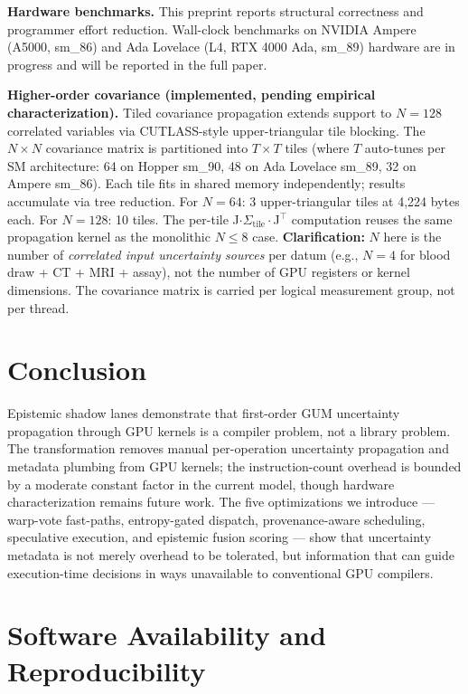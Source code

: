\documentclass[11pt]{article}
\begin{document}
{{{{\textbf{Hardware benchmarks.} This preprint reports structural correctness and programmer effort reduction. Wall-clock benchmarks on NVIDIA Ampere (A5000, sm_86) and Ada Lovelace (L4, RTX 4000 Ada, sm_89) hardware are in progress and will be reported in the full paper.

\textbf{Higher-order covariance (implemented, pending empirical characterization).} Tiled covariance propagation extends support to $N = 128$ correlated variables via CUTLASS-style upper-triangular tile blocking. The $N \times N$ covariance matrix is partitioned into $T \times T$ tiles (where $T$ auto-tunes per SM architecture: 64 on Hopper sm\_90, 48 on Ada Lovelace sm\_89, 32 on Ampere sm\_86). Each tile fits in shared memory independently; results accumulate via tree reduction. For $N = 64$: 3 upper-triangular tiles at 4,224 bytes each. For $N = 128$: 10 tiles. The per-tile J$\cdot\Sigma_{\text{tile}}\cdot$J$^\top$ computation reuses the same propagation kernel as the monolithic $N \leq 8$ case. \textbf{Clarification:} $N$ here is the number of \emph{correlated input uncertainty sources} per datum (e.g., $N = 4$ for blood draw + CT + MRI + assay), not the number of GPU registers or kernel dimensions. The covariance matrix is carried per logical measurement group, not per thread.


\section{Conclusion}

Epistemic shadow lanes demonstrate that first-order GUM uncertainty propagation through GPU kernels is a compiler problem, not a library problem. The transformation removes manual per-operation uncertainty propagation and metadata plumbing from GPU kernels; the instruction-count overhead is bounded by a moderate constant factor in the current model, though hardware characterization remains future work. The five optimizations we introduce --- warp-vote fast-paths, entropy-gated dispatch, provenance-aware scheduling, speculative execution, and epistemic fusion scoring --- show that uncertainty metadata is not merely overhead to be tolerated, but information that can guide execution-time decisions in ways unavailable to conventional GPU compilers.


\section{Software Availability and Reproducibility}

}}}}
\end{document}
